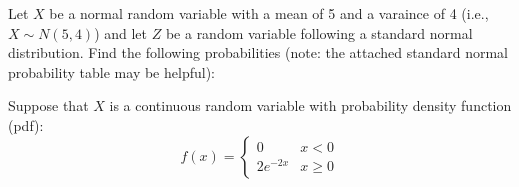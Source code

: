 \documentclass[addpoints]{examsetup}\usepackage[]{graphicx}\usepackage[]{color}
\begin{document}
\begin{questions}
\newpage
 
\question

Let $X$ be a normal random variable with a mean of 5 and a varaince of 4 (i.e., $X \sim N(5,4)$) and let $Z$ be a random variable following a standard normal distribution.
Find the following probabilities (note: the attached standard normal probability table may be helpful):

\question 
 
 Suppose that $X$ is a continuous random variable with probability density function (pdf):
 $$
 f(x) = 
 \begin{cases}
     0 &  x < 0 \\
     2 e^{-2x} &  x \ge 0
 \end{cases}
 $$
 
\end{questions}
\end{document}
